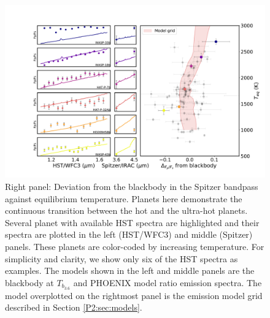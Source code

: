 \begin{figure}
    \centering
    \includegraphics[trim={3.5cm 1cm 0cm 1cm},clip,width=\textwidth]{devBBandHST_Teq_selection.pdf}
    \caption{Right  panel: Deviation from the blackbody in the Spitzer bandpass against equilibrium temperature. Planets here demonstrate the continuous transition between the hot and the ultra-hot planets. Several planet with available HST spectra are highlighted and their spectra are plotted in the left   (HST/WFC3) and middle (Spitzer) panels. These planets are color-coded by increasing temperature. For simplicity and clarity, we show only six of the HST spectra as examples. The models shown in the left and middle panels are the blackbody at $T_{b_{3.6}}$ and PHOENIX model ratio emission spectra. The model overplotted on the rightmost panel is the emission model grid described in Section \ref{P2:sec:models}.}
    \label{P2:fig:devBBHST}
\end{figure}

